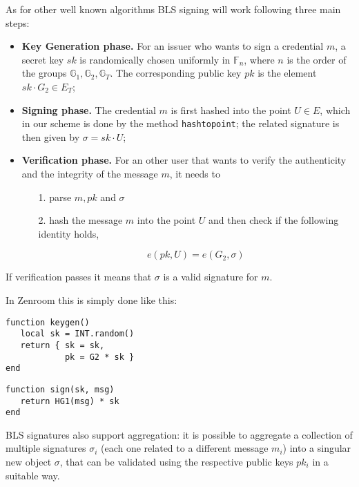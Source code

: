 \documentclass[conference]{IEEEtran}
\begin{document}
As for other well known algorithms BLS signing will work following
three main steps:
\begin{itemize}

\item \textbf{Key Generation phase.} For an issuer who wants to sign
  a credential $m$, a secret key $sk$ is randomically chosen
  uniformly in $\mathbb{F}_n$, where $n$ is the order of the
  groups $\mathbb{G}_1, \mathbb{G}_2, \mathbb{G}_T$. The
  corresponding public key $pk$ is the element $sk\cdot G_2\in
  E_T$;

\item \textbf{Signing phase.} The credential $m$ is first hashed into
  the point $U\in E$, which in our scheme is done by the method
  \verb!hashtopoint!; the related signature is then given by $\sigma =
  sk\cdot U$;

\item \textbf{Verification phase.} For an other user that wants to
  verify the authenticity and the integrity of the message $m$, it
  needs to

  \begin{itemize}

  \item [1.] parse $m, pk$ and $\sigma$

  \item [2.] hash the message $m$ into the point $U$ and then
    check if the following identity holds,

    \[
    e(pk,U) = e(G_2,\sigma)
    \]

  \end{itemize}

\end{itemize}

If verification passes it means that $\sigma$ is a valid signature for
$m$.

 In Zenroom this is simply done like this:

\begin{lstlisting}[style=lua,caption={Issuer key generation}]
function keygen()
   local sk = INT.random()
   return { sk = sk,
			pk = G2 * sk }
end
\end{lstlisting}

\begin{lstlisting}[style=lua,caption={Issuer signature}]
function sign(sk, msg)
   return HG1(msg) * sk
end
\end{lstlisting}

BLS signatures also support aggregation: it is possible to aggregate a
collection of multiple signatures $\sigma_i$ (each one related to a
different message $m_i$) into a singular new object $\sigma$, that can
be validated using the respective public keys $pk_i$ in a suitable
way.
\end{document}
